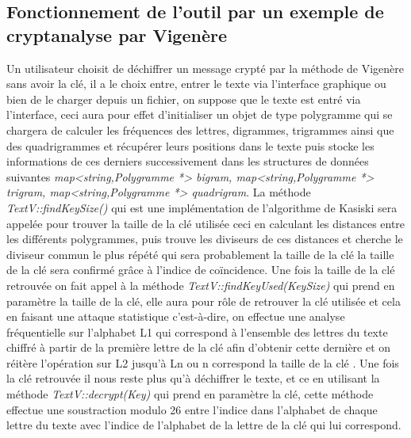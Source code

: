 \documentclass[11pt]{article}
\begin{document}
\begin{enumerate}
\subsection{Fonctionnement de l'outil par un exemple de cryptanalyse par Vigenère}

Un utilisateur choisit de déchiffrer un message crypté par la méthode de Vigenère sans avoir la clé, il a le choix entre, entrer le texte via l'interface graphique ou bien de le charger depuis un fichier, on suppose que le texte est entré via l’interface, ceci aura pour effet d’initialiser un objet de type polygramme qui se chargera de calculer les fréquences des lettres, digrammes, trigrammes ainsi que des quadrigrammes et récupérer leurs positions dans le texte puis stocke les informations de ces derniers successivement dans les structures de données suivantes  \textit{map<string,Polygramme *> bigram, map<string,Polygramme *> trigram, map<string,Polygramme *> quadrigram}.
La méthode  \textit{TextV::findKeySize()} qui est une implémentation de l’algorithme de Kasiski sera appelée pour trouver la taille de la clé utilisée ceci en calculant les distances entre les différents polygrammes, puis trouve les diviseurs de ces distances et cherche le diviseur commun le plus répété qui sera probablement la taille de la clé la taille de la clé sera confirmé grâce à l’indice de coïncidence.
Une fois la taille de la clé retrouvée on fait appel à la méthode \textit{TextV::findKeyUsed(KeySize)} qui prend en paramètre la taille de la clé, elle aura pour rôle de retrouver la clé utilisée et cela en faisant une attaque statistique c’est-à-dire, on effectue une analyse fréquentielle sur  l’alphabet L1 qui correspond à l’ensemble des lettres du texte chiffré à partir de la première lettre de la clé afin d’obtenir cette dernière et on réitère l’opération sur L2 jusqu’à Ln ou n correspond la taille de la clé . 
Une fois la clé retrouvée il nous reste plus qu’à déchiffrer le texte, et ce en utilisant la méthode  \textit{TextV::decrypt(Key)} qui prend en paramètre la clé, cette méthode effectue une soustraction modulo 26 entre l’indice dans l’alphabet de chaque lettre du texte avec l’indice de l’alphabet de la lettre de la clé qui lui correspond.


\end{enumerate}
\end{document}
